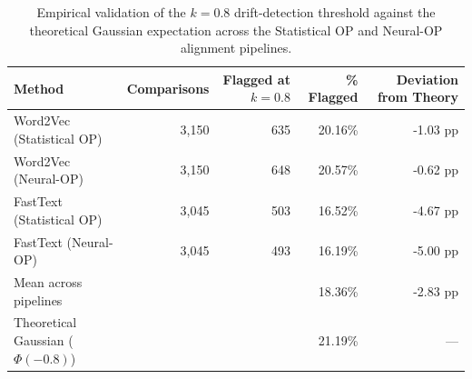 \begin{table}[htbp]
\centering
\begin{tabular}{lrrrr}
\toprule
Method & Comparisons & Flagged at $k=0.8$ & \% Flagged & Deviation from Theory \\
\midrule
Word2Vec (Statistical OP) & 3,150 & 635 & 20.16\% & -1.03 pp \\
Word2Vec (Neural-OP) & 3,150 & 648 & 20.57\% & -0.62 pp \\
FastText (Statistical OP) & 3,045 & 503 & 16.52\% & -4.67 pp \\
FastText (Neural-OP) & 3,045 & 493 & 16.19\% & -5.00 pp \\
\midrule
Mean across pipelines & & & 18.36\% & -2.83 pp \\
Theoretical Gaussian ($\Phi(-0.8)$) & & & 21.19\% & --- \\
\bottomrule
\end{tabular}
\caption{Empirical validation of the $k=0.8$ drift-detection threshold against the theoretical Gaussian expectation across the Statistical OP and Neural-OP alignment pipelines.}
\label{tab:k_threshold_validation}
\end{table}
